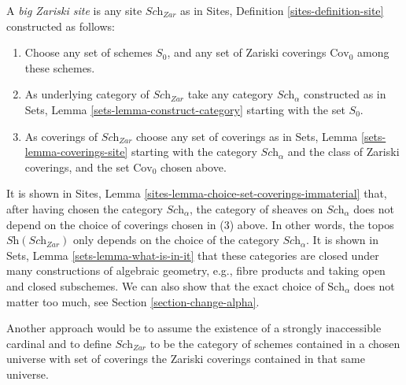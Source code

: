 \begin{definition}
\label{definition-big-zariski-site}
A {\it big Zariski site} is any site $\textit{Sch}_{Zar}$ as in
Sites, Definition \ref{sites-definition-site} constructed as follows:
\begin{enumerate}
\item Choose any set of schemes $S_0$, and any set of Zariski coverings
$\text{Cov}_0$ among these schemes.
\item As underlying category of $\textit{Sch}_{Zar}$
take any category $\textit{Sch}_\alpha$ constructed as in
Sets, Lemma \ref{sets-lemma-construct-category} starting with the set $S_0$.
\item As coverings of $\textit{Sch}_{Zar}$ choose any set of coverings as in
Sets, Lemma \ref{sets-lemma-coverings-site} starting with the
category $\textit{Sch}_\alpha$ and the class of Zariski coverings,
and the set $\text{Cov}_0$ chosen above.
\end{enumerate}
\end{definition}

\noindent
It is shown in Sites, Lemma \ref{sites-lemma-choice-set-coverings-immaterial}
that, after having chosen the category $\textit{Sch}_\alpha$, the
category of sheaves on $\textit{Sch}_\alpha$ does not depend on the
choice of coverings chosen in (3) above. In other words, the topos
$\textit{Sh}(\textit{Sch}_{Zar})$ only depends on the choice of
the category $\textit{Sch}_\alpha$. It is shown in
Sets, Lemma \ref{sets-lemma-what-is-in-it} that these categories
are closed under many constructions of algebraic geometry, e.g.,
fibre products and taking open and closed subschemes. We can also show
that the exact choice of $\text{Sch}_\alpha$ does not matter
too much, see Section \ref{section-change-alpha}.

\medskip\noindent
Another approach would be to assume the existence of a
strongly inaccessible cardinal and to define $\textit{Sch}_{Zar}$
to be the category of schemes contained in a chosen universe with
set of coverings the Zariski coverings contained in that same
universe.

